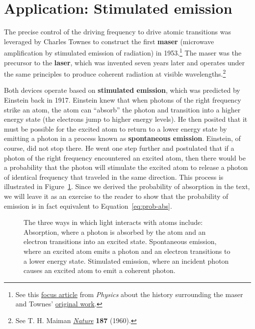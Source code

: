 
\section{Application: Stimulated emission}
The precise control of the driving frequency to drive atomic transitions was leveraged by Charles Townes to construct the first \textbf{maser} (microwave amplification by stimulated emission of radiation) in 1953.\footnote{See this \href{https://physics.aps.org/story/v15/st4}{focus article} from \emph{Physics} about the history surrounding the maser and Townes' \href{https://journals.aps.org/pr/abstract/10.1103/PhysRev.99.1264}{original work}.} The maser was the precursor to the \textbf{laser}, which was invented seven years later and operates under the same principles to produce coherent radiation at visible wavelengths.\footnote{See T. H. Maiman \href{https://www.nature.com/nature/journal/v187/n4736/pdf/187493a0.pdf}{\emph{Nature}} \textbf{187} (1960).} \par

Both devices operate based on \textbf{stimulated emission}, which was predicted by Einstein back in 1917. Einstein knew that when photons of the right frequency strike an atom, the atom can ``absorb'' the photon and transition into a higher energy state (the electrons jump to higher energy levels). He then posited that it must be possible for the excited atom to return to a lower energy state by emitting a photon in a process known as \textbf{spontaneous emission}. Einstein, of course, did not stop there. He went one step further and postulated that if a photon of the right frequency encountered an excited atom, then there would be a probability that the photon will stimulate the excited atom to release a photon of identical frequency that traveled in the same direction. This process is illustrated in Figure~\ref{fig:laser}. Since we derived the probability of absorption in the text, we will leave it as an exercise to the reader to show that the probability of emission is in fact equivalent to Equation~\ref{eq:prob-abs}.

\begin{figure}[!h]
	\centering
	 \qquad 
	 \qquad 
	\caption{The three ways in which light interacts with atoms include: \protect{} Absorption, where a photon is absorbed by the atom and an electron transitions into an excited state. \protect{} Spontaneous emission, where an excited atom emits a photon and an electron transitions to a lower energy state. \protect{} Stimulated emission, where an incident photon causes an excited atom to emit a coherent photon.}
	\label{fig:laser}
\end{figure}

